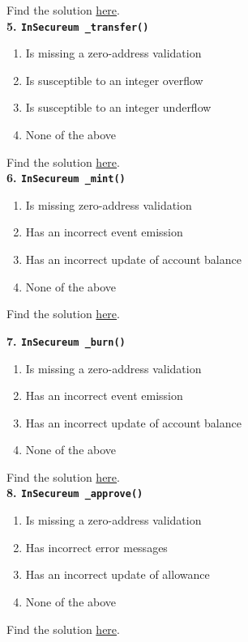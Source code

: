 Find the solution \hyperref[sec:race4_q4]{here}.\\

\textbf{5. \texttt{InSecureum \_transfer()}}

\begin{enumerate}[label=\Alph*.]
    \item Is missing a zero-address validation
    \item Is susceptible to an integer overflow
    \item Is susceptible to an integer underflow
    \item None of the above
\end{enumerate}

Find the solution \hyperref[sec:race4_q5]{here}.\\

\textbf{6. \texttt{InSecureum \_mint()}}

\begin{enumerate}[label=\Alph*.]
    \item Is missing zero-address validation
    \item Has an incorrect event emission
    \item Has an incorrect update of account balance
    \item None of the above
\end{enumerate}

Find the solution \hyperref[sec:exam2_q6]{here}.\\

\pagebreak

\textbf{7. \texttt{InSecureum \_burn()}}

\begin{enumerate}[label=\Alph*.]
    \item Is missing a zero-address validation
    \item Has an incorrect event emission
    \item Has an incorrect update of account balance
    \item None of the above
\end{enumerate}

Find the solution \hyperref[sec:exam2_q7]{here}.\\

\textbf{8. \texttt{InSecureum \_approve()}}

\begin{enumerate}[label=\Alph*.]
    \item Is missing a zero-address validation
    \item Has incorrect error messages
    \item Has an incorrect update of allowance
    \item None of the above
\end{enumerate}

Find the solution \hyperref[sec:race4_q8]{here}.\\